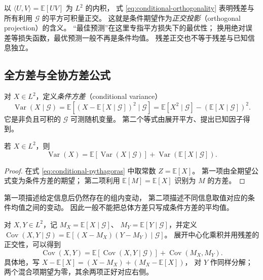 \documentclass[UTF8,12pt,a4paper,fontset=fandol]{ctexart}
\begin{document}
以 $\langle U,V\rangle=\mathbb E[UV]$ 为 $L^2$ 的内积，
式 \eqref{eq:conditional-orthogonality} 表明残差与所有利用 $\mathcal G$ 的平方可积量正交。
这就是条件期望作为\emph{正交投影}（orthogonal projection）的含义。
“最佳预测”在这里专指平方损失下的最优性；
换用绝对误差等损失函数，最优预测一般不再是条件均值。
残差正交也不等于残差与已知信息独立。

\subsection{全方差与全协方差公式}

对 $X\in L^2$，定义\emph{条件方差}（conditional variance）
\[
  \operatorname{Var}(X\mid\mathcal G)
  =\mathbb E[(X-\mathbb E[X\mid\mathcal G])^2\mid\mathcal G]
  =\mathbb E[X^2\mid\mathcal G]-(\mathbb E[X\mid\mathcal G])^2.
\]
它是非负且可积的 $\mathcal G$ 可测随机变量。
第二个等式由展开平方、提出已知因子得到。

\begin{proposition}[全方差公式]
\label{prop:conditional-total-variance}
若 $X\in L^2$，则
\begin{equation}
  \operatorname{Var}(X)
  =\mathbb E[\operatorname{Var}(X\mid\mathcal G)]
   +\operatorname{Var}(\mathbb E[X\mid\mathcal G]).
  \label{eq:conditional-total-variance}
\end{equation}
\end{proposition}

\begin{proof}
在式 \eqref{eq:conditional-pythagoras} 中取常数 $Z=\mathbb E[X]$。
第一项由全期望公式变为条件方差的期望；
第二项利用 $\mathbb E[M]=\mathbb E[X]$ 识别为 $M$ 的方差。
\end{proof}

第一项描述给定信息后仍然存在的组内变动，
第二项描述不同信息取值对应的条件均值之间的变动。
因此一般不能把总体方差只写成条件方差的平均值。

对 $X,Y\in L^2$，记 $M_X=\mathbb E[X\mid\mathcal G]$、
$M_Y=\mathbb E[Y\mid\mathcal G]$，并定义
$\operatorname{Cov}(X,Y\mid\mathcal G)
=\mathbb E[(X-M_X)(Y-M_Y)\mid\mathcal G]$。
展开中心化乘积并用残差的正交性，可以得到
\begin{equation}
  \operatorname{Cov}(X,Y)
  =\mathbb E[\operatorname{Cov}(X,Y\mid\mathcal G)]
   +\operatorname{Cov}(M_X,M_Y).
  \label{eq:conditional-total-covariance}
\end{equation}
具体地，写 $X-\mathbb E[X]=(X-M_X)+(M_X-\mathbb E[X])$，
对 $Y$ 作同样分解；两个混合项期望为零，其余两项正好对应右侧。
\end{document}
